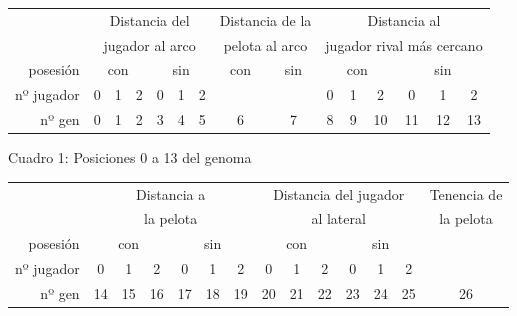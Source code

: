 \begin{tabular}{r|ccc|ccc|c|c|ccc|ccc|}
\cline{2-15}
                                 & \multicolumn{6}{c|}{Distancia del}                                                                        & \multicolumn{2}{c|}{Distancia de la} & \multicolumn{6}{c|}{Distancia al}                                                                             \\
                                 & \multicolumn{6}{c|}{jugador al arco}                                                                      & \multicolumn{2}{c|}{pelota al arco}  & \multicolumn{6}{c|}{jugador rival más cercano}                                                                \\ \hline
\multicolumn{1}{|r|}{posesión}   & \multicolumn{3}{c|}{con}                            & \multicolumn{3}{c|}{sin}                            & con               & sin              & \multicolumn{3}{c|}{con}                             & \multicolumn{3}{c|}{sin}                               \\ \hline
\multicolumn{1}{|r|}{nº jugador} & 0                      & 1                      & 2 & 0                      & 1                      & 2 &                   &                  & 0                      & 1                      & 2  & 0                       & 1                       & 2  \\ \hline
\multicolumn{1}{|r|}{nº gen}     & \multicolumn{1}{c|}{0} & \multicolumn{1}{c|}{1} & 2 & \multicolumn{1}{c|}{3} & \multicolumn{1}{c|}{4} & 5 & 6                 & 7                & \multicolumn{1}{c|}{8} & \multicolumn{1}{c|}{9} & 10 & \multicolumn{1}{c|}{11} & \multicolumn{1}{c|}{12} & 13 \\ \hline
\end{tabular}

\vskip 1mm
\begin{center}
{Cuadro 1: Posiciones 0 a 13 del genoma}
\end{center}

\begin{tabular}{r|ccc|ccc|ccc|ccc|c|}
\cline{2-14}
 & \multicolumn{6}{c|}{Distancia a} & \multicolumn{6}{c|}{Distancia del jugador} & Tenencia de \\
 & \multicolumn{6}{c|}{la pelota} & \multicolumn{6}{c|}{al lateral} & la pelota \\ \hline
\multicolumn{1}{|r|}{posesión} & \multicolumn{3}{c|}{con} & \multicolumn{3}{c|}{sin} & \multicolumn{3}{c|}{con} & \multicolumn{3}{c|}{sin} &  \\ \hline
\multicolumn{1}{|r|}{nº jugador} & 0 & 1 & 2 & 0 & 1 & 2 & 0 & 1 & 2 & 0 & 1 & 2 &  \\ \hline
\multicolumn{1}{|r|}{nº gen} & \multicolumn{1}{c|}{14} & \multicolumn{1}{c|}{15} & 16 & \multicolumn{1}{c|}{17} & \multicolumn{1}{c|}{18} & 19 & \multicolumn{1}{c|}{20} & \multicolumn{1}{c|}{21} & 22 & \multicolumn{1}{c|}{23} & \multicolumn{1}{c|}{24} & 25 & 26 \\ \hline
\end{tabular}

